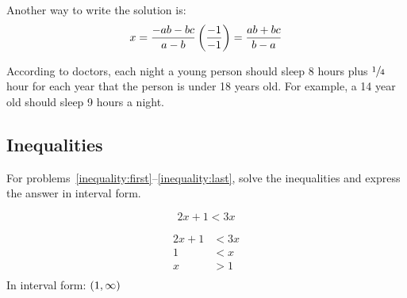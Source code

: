 \documentclass[letterpaper, landscape]{exam}
\begin{document}
\begin{questions}
\begin{solution}
        Another way to write the solution is: 
        \[ 
          x = \frac{-ab - bc}{a - b} \del{ \frac{-1}{-1} } = \frac{ab + bc}{b - a} 
        \]

      \end{solution}

    \question{}
    According to doctors, each night a young person should sleep 8 hours plus
    $\sfrac{1}{4}$ hour for each year that the person is under 18 years old.  For
    example, a 14 year old should sleep 9 hours a night.


    \subsection{Inequalities}

    For problems~\ref{inequality:first}--\ref{inequality:last}, solve the
    inequalities and express the answer in interval form.

    \question[5]\label{inequality:first} 
      \[
        2x + 1 < 3x
      \]

      \begin{solution}
        \begin{align*}
          2x + 1 & < 3x \\
          1      & < x \\
          x      & > 1 \\
        \end{align*}
        In interval form: $\intoo{ 1, \infty }$
    \end{solution}


\end{questions}
\end{document}
